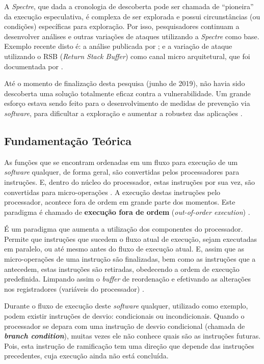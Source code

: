\documentclass[
	article,			    %
	12pt,				    %
	oneside,			    %
	a4paper,			    %
	chapter=TITLE,		    %
	section=TITLE,		    %
	subsection=TITLE,	    %
	english,			    %
	brazil,				    %
	sumario=tradicional
]{abntex2}
\begin{document}
A \emph{Spectre}, que dada a cronologia de descoberta pode ser chamada de ``pioneira'' da execução especulativa, é complexa de ser explorada e possui circunstâncias (ou condições) específicas para exploração. Por isso, pesquisadores continuam a desenvolver análises e outras variações de ataques utilizando a \emph{Spectre} como base. Exemplo recente disto é: a análise publicada por ; e a variação de ataque utilizando o RSB (\emph{Return Stack Buffer}) como canal micro arquitetural, que foi documentada por .

Até o momento de finalização desta pesquisa (junho de 2019), não havia sido descoberta uma solução totalmente eficaz contra a vulnerabilidade. Um grande esforço estava sendo feito para o desenvolvimento de medidas de prevenção via \emph{software}, para dificultar a exploração e aumentar a robustez das aplicações \cite{Graz2018Meltdown}.

\subsection{Fundamentação Teórica}
As funções que se encontram ordenadas em um fluxo para execução de um \emph{software} qualquer, de forma geral, são convertidas pelos processadores para instruções. E, dentro do núcleo do processador, estas instruções por sua vez, são convertidas para micro-operações \cite{Alisson2017Introducao}. A execução destas instruções pelo processador, acontece fora de ordem em grande parte dos momentos. Este paradigma é chamado de \textbf{execução fora de ordem} (\emph{out-of-order execution}) \cite{Fog2017Microarchitecture}.

É um paradigma que aumenta a utilização dos componentes do processador. Permite que instruções que sucedem o fluxo atual de execução, sejam executadas em paralelo, ou até mesmo antes do fluxo de execução atual. E, assim que as micro-operações de uma instrução são finalizadas, bem como as instruções que a antecedem, estas instruções são retiradas, obedecendo a ordem de execução predefinida. Limpando assim o \emph{buffer} de reordenação e efetivando as alterações nos registradores (variáveis do processador) \cite{Kocher2018Spectre}.

Durante o fluxo de execução deste \emph{software} qualquer, utilizado como exemplo, podem existir instruções de desvio: condicionais ou incondicionais. Quando o processador se depara com uma instrução de desvio condicional (chamada de \textbf{\emph{branch condition}}), muitas vezes ele não conhece quais são as instruções futuras. Pois, esta instrução de ramificação tem uma direção que depende das instruções precedentes, cuja execução ainda não está concluída. 
\end{document}
